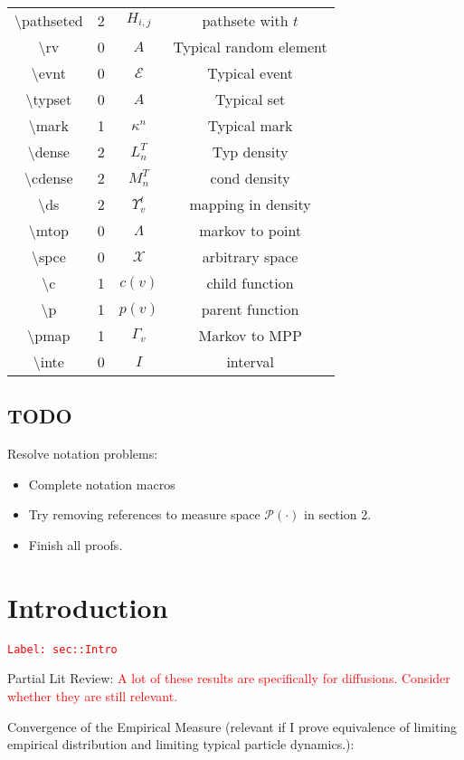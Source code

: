 \documentclass[12pt]{article}
\newcommand{\mc}{\mathcal}
\newcommand{\tr}{\textcolor{red}}
\newcommand{\labe}[1]{\tr{\texttt{Label: #1}}}
\newcommand{\tbs}{\textbackslash}
\newcommand{\pmsr}{\mc{P}}							%
\renewcommand{\v}{v}							%
\newcommand{\T}{T}								%
\renewcommand{\t}{t}							%
\newcommand{\itt}{i}								%
\newcommand{\ittt}{j}								%
\newcommand{\numb}{n}								%
\newcommand{\pathseted}[2]{H_{#1,#2}}			%
\newcommand{\rv}{A}								%
\newcommand{\evnt}{\mc{E}}						%
\newcommand{\typset}{A}							%
\renewcommand{\mark}[1]{\kappa^{#1}}				%
\newcommand{\dense}[2]{L_{#1}^{#2}}				%
\newcommand{\cdense}[2]{M_{#1}^{#2}}			%
\newcommand{\ds}[2]{\Upsilon_{#1}^{#2}}			%
\newcommand{\mtop}{\Lambda}						%
\newcommand{\spce}{\mc{X}}						%
\renewcommand{\c}[1]{c(#1)}						%
\newcommand{\p}[1]{p(#1)}						%
\newcommand{\pmap}[1]{\Gamma_{#1}}				%
\newcommand{\inte}{I}							%
\begin{document}
\begin{longtable}{c|c|c|c}
\tbs pathseted&2&\(\pathseted{\itt}{\ittt}\)&pathsete with \(\t\)\\
\tbs rv&0& \(\rv\)							&Typical random element\\
\tbs evnt&0&\(\evnt\)						&Typical event\\
\tbs typset&0&\(\typset\)					&Typical set\\
\tbs mark&1&\(\mark{\numb}\)				&Typical mark\\
\tbs dense&2& \(\dense{\numb}{\T}\)			&Typ density\\
\tbs cdense&2&\(\cdense{\numb}{\T}\)		&cond density\\
\tbs ds&2& \(\ds{\v}{\t}\)					&mapping in density\\
\tbs mtop &0& \(\mtop\)						&markov to point\\
\tbs spce &0&\(\spce\)						&arbitrary space\\
\tbs c &1& \(\c{\v}\)						&child function\\
\tbs p &1& \(\p{\v}\)						&parent function \\
\tbs pmap &1& \(\pmap{\v}\)					&Markov to MPP\\
\tbs inte &0& \(\inte\)						&interval
\end{longtable}

\subsection*{TODO}

Resolve notation problems:

\begin{itemize}
\item Complete notation macros

\item Try removing references to measure space \(\pmsr(\cdot)\) in section 2.

\item Finish all proofs.
\end{itemize}

\section{Introduction}
\label{sec::Intro}\labe{sec::Intro}

Partial Lit Review: \tr{A lot of these results are specifically for diffusions. Consider whether they are still relevant.}

Convergence of the Empirical Measure (relevant if I prove equivalence of limiting empirical distribution and limiting typical particle dynamics.):
\end{document}
